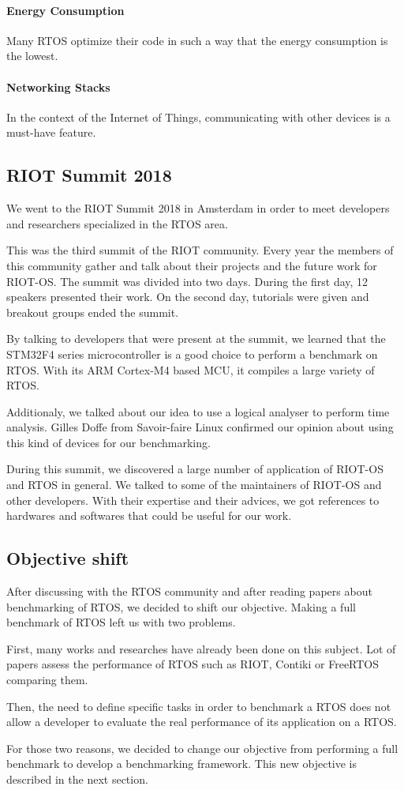\paragraph{Energy Consumption}
Many RTOS optimize their code in such a way that the energy consumption is the lowest.

\paragraph{Networking Stacks}
In the context of the Internet of Things, communicating with other devices is a must-have feature.

\subsection{RIOT Summit 2018}
We went to the RIOT Summit 2018 in Amsterdam in order to meet developers and researchers specialized in the RTOS area.

This was the third summit of the RIOT community.
Every year the members of this community gather and talk about their projects and the future work for RIOT-OS.
The summit was divided into two days. During the first day, 12 speakers presented their work. On the second day, tutorials were given and breakout groups ended the summit.

By talking to developers that were present at the summit, we learned that the STM32F4 series microcontroller is a good choice to perform a benchmark on RTOS. With its ARM Cortex-M4 based MCU, it compiles a large variety of RTOS.

Additionaly, we talked about our idea to use a logical analyser to perform time analysis. Gilles Doffe from Savoir-faire Linux confirmed our opinion about using this kind of devices for our benchmarking.

During this summit, we discovered a large number of application of RIOT-OS and RTOS in general.
We talked to some of the maintainers of RIOT-OS and other developers. With their expertise and their advices, we got references to hardwares and softwares that could be useful for our work.

\subsection{Objective shift}

After discussing with the RTOS community and after reading papers about benchmarking of RTOS, we decided to shift our objective.
Making a full benchmark of RTOS left us with two problems.

First, many works and researches have already been done on this subject.
Lot of papers assess the performance of RTOS such as RIOT, Contiki or FreeRTOS comparing them.

Then, the need to define specific tasks in order to benchmark a RTOS does not allow a developer to evaluate the real performance of its application on a RTOS.

For those two reasons, we decided to change our objective from performing a full benchmark to develop a benchmarking framework.
This new objective is described in the next section.